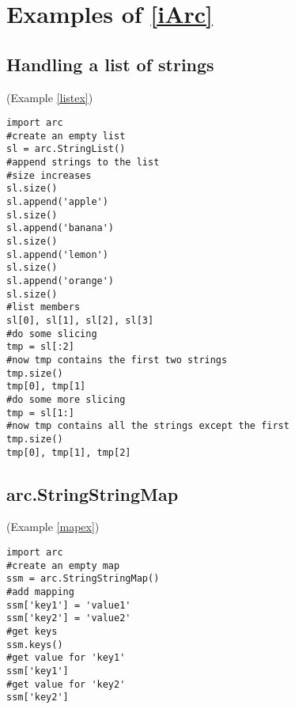 \section{Examples of \ref{iArc}}
\subsection{Handling a list of strings}
(Example \ref{listex})
\label{clistex}
\begin{verbatim}
import arc
#create an empty list
sl = arc.StringList()
#append strings to the list
#size increases
sl.size()
sl.append('apple')
sl.size()
sl.append('banana')
sl.size()
sl.append('lemon')
sl.size()
sl.append('orange')
sl.size()
#list members
sl[0], sl[1], sl[2], sl[3]
#do some slicing
tmp = sl[:2]
#now tmp contains the first two strings
tmp.size()
tmp[0], tmp[1]
#do some more slicing
tmp = sl[1:]
#now tmp contains all the strings except the first
tmp.size()
tmp[0], tmp[1], tmp[2]
\end{verbatim}

\subsection{arc.StringStringMap}
(Example \ref{mapex})
\label{cmapex}
\begin{verbatim}
import arc
#create an empty map
ssm = arc.StringStringMap()
#add mapping
ssm['key1'] = 'value1'
ssm['key2'] = 'value2'
#get keys
ssm.keys()
#get value for 'key1'
ssm['key1']
#get value for 'key2'
ssm['key2']
\end{verbatim}

